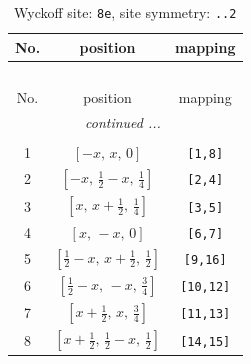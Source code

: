 \documentclass[fleqn,8pt]{jsarticle}
\begin{document}
\begin{longtable}{ccc}
\caption{Wyckoff site: {\tt 8e}, site symmetry: {\tt ..2}}
 \\
 \hline \hline
No. & position & mapping \\ \hline \endfirsthead

\multicolumn{2}{l}{\tablename\ \thetable{}} \\
 \hline \hline
No. & position & mapping \\ \hline \endhead

 \hline \hline
\multicolumn{2}{r}{\footnotesize\it continued ...} \\ \endfoot

 \hline \hline
\multicolumn{2}{r}{} \\ \endlastfoot

1 & $\left[ - x,\, x,\, 0 \right]$ & {\tt [1,8]} \\ \hline
2 & $\left[ - x,\, \frac{1}{2} - x,\, \frac{1}{4} \right]$ & {\tt [2,4]} \\ \hline
3 & $\left[ x,\, x + \frac{1}{2},\, \frac{1}{4} \right]$ & {\tt [3,5]} \\ \hline
4 & $\left[ x,\, - x,\, 0 \right]$ & {\tt [6,7]} \\ \hline
5 & $\left[ \frac{1}{2} - x,\, x + \frac{1}{2},\, \frac{1}{2} \right]$ & {\tt [9,16]} \\ \hline
6 & $\left[ \frac{1}{2} - x,\, - x,\, \frac{3}{4} \right]$ & {\tt [10,12]} \\ \hline
7 & $\left[ x + \frac{1}{2},\, x,\, \frac{3}{4} \right]$ & {\tt [11,13]} \\ \hline
8 & $\left[ x + \frac{1}{2},\, \frac{1}{2} - x,\, \frac{1}{2} \right]$ & {\tt [14,15]} \\
\end{longtable}
\renewcommand{\arraystretch}{1.2}
\end{document}
